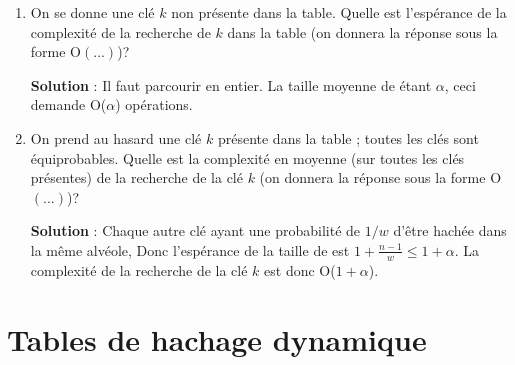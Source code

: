 \documentclass[10pt,a4paper, varwidth]{article}
\begin{document}
	\begin{enumerate}
		\item On se donne une clé $k$ non présente dans la table. Quelle est l'espérance de la complexité de la
		recherche de $k$ dans la table (on donnera la réponse sous la forme O$(...)$)?
        \if{}
        \begin{emphase}
            \textbf{Solution} : Il faut parcourir  en entier. La taille moyenne
            de  étant $\alpha$, ceci demande O($\alpha$) opérations.
        \end{emphase}
        \fi
		\item On prend au hasard une clé $k$ présente dans la table ; toutes les clés sont équiprobables. 
        Quelle est la complexité en moyenne (sur toutes les clés présentes) de
		la recherche de la clé $k$ (on donnera la réponse sous la forme O$(...)$)?
        \if{}
        \begin{emphase}
            \textbf{Solution} : Chaque autre clé ayant une probabilité de $1/w$ d'être hachée dans la même alvéole,
            Donc l'espérance de la taille de  est $1 + \frac{n - 1}{w} \leq 1 + \alpha$.
            La complexité de la recherche de la clé $k$ est donc O($1 + \alpha$).
        \end{emphase}
        \fi
	\end{enumerate}
	
	\section{Tables de hachage dynamique}
	
\end{document}
